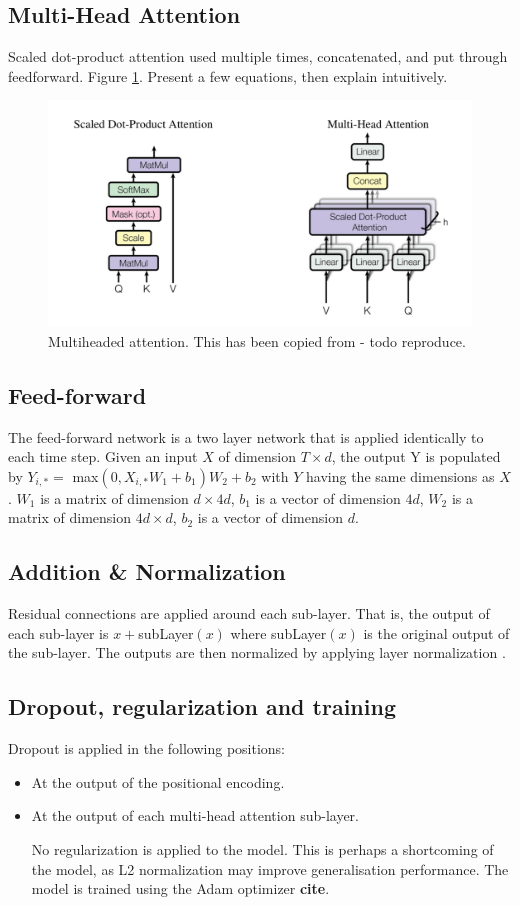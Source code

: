 \documentclass[conference]{IEEEtran}
\begin{document}
\subsection{Multi-Head Attention}
Scaled dot-product attention used multiple times, concatenated, and put through feedforward.
Figure \ref{fig:multihead}.
Present a few equations, then explain intuitively.

\begin{figure}[htbp]
	\centerline{\includegraphics[width=.35\textwidth]{images/multihead_attention_vaswani_copied.png}}
	\caption{Multiheaded attention. This has been copied from \cite{Vaswani2017} - todo reproduce.}
	\label{fig:multihead}
\end{figure}

\subsection{Feed-forward}
The feed-forward network is a two layer network that is applied identically to each time step.
Given an input $X$ of dimension $T \times d$, the output Y is populated by $Y_{i,*} = $ max$(0, X_{i,*}  W_1 + b_1)  W_2 + b_2$ with $Y$ having the same dimensions as $X$.
$W_1$ is a matrix of dimension $d \times 4d$, $b_1$ is a vector of dimension $4d$, $W_2$ is a matrix of dimension $4d \times d$, $b_2$ is a vector of dimension $d$.

\subsection{Addition \& Normalization}
Residual connections \cite{He2015} are applied around each sub-layer.
That is, the output of each sub-layer is $x + $subLayer$(x)$ where subLayer$(x)$ is the original output of the sub-layer.
The outputs are then normalized by applying layer normalization \cite{Ba2016}.

\subsection{Dropout, regularization and training}
Dropout is applied in the following positions:
\begin{itemize}
	\item At the output of the positional encoding. 
	\item At the output of each multi-head attention sub-layer.
	
No regularization is applied to the model. 
This is perhaps a shortcoming of the model, as L2 normalization may improve generalisation performance.
The model is trained using the Adam optimizer \textbf{cite}.
\end{itemize}
\end{document}
